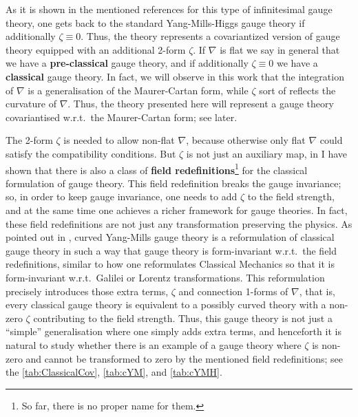 \documentclass[reqno,a4paper,oneside]{amsart}
\theoremstyle{plain}
\theoremstyle{remark}
\theoremstyle{definition}
\begin{document}
As it is shown in the mentioned references for this type of infinitesimal gauge theory, one gets back to the standard Yang-Mills-Higgs gauge theory if additionally $\zeta \equiv 0$. Thus, the theory represents a covariantized version of gauge theory equipped with an additional 2-form $\zeta$. If $\nabla$ is flat we say in general that we have a \textbf{pre-classical} gauge theory, and if additionally $\zeta \equiv 0$ we have a \textbf{classical} gauge theory. In fact, we will observe in this work that the integration of $\nabla$ is a generalisation of the Maurer-Cartan form, while $\zeta$ sort of reflects the curvature of $\nabla$. Thus, the theory presented here will represent a gauge theory covariantised w.r.t.\ the Maurer-Cartan form; see later.

The 2-form $\zeta$ is needed to allow non-flat $\nabla$, because otherwise only flat $\nabla$ could satisfy the compatibility conditions. But $\zeta$ is not just an auxiliary map, in \cite{MyThesis} I have shown that there is also a class of \textbf{field redefinitions}\footnote{So far, there is no proper name for them.} for the classical formulation of gauge theory. This field redefinition breaks the gauge invariance; so, in order to keep gauge invariance, one needs to add $\zeta$ to the field strength, and at the same time one achieves a richer framework for gauge theories. 
In fact, these field redefinitions are not just any transformation preserving the physics. As pointed out in \cite{MyThesis}, curved Yang-Mills gauge theory is a reformulation of classical gauge theory in such a way that gauge theory is form-invariant w.r.t.\ the field redefinitions, similar to how one reformulates Classical Mechanics so that it is form-invariant w.r.t.\ Galilei or Lorentz transformations. This reformulation precisely introduces those extra terms, $\zeta$ and connection 1-forms of $\nabla$, that is, every classical gauge theory is equivalent to a possibly curved theory with a non-zero $\zeta$ contributing to the field strength. Thus, this gauge theory is not just a ``simple'' generalisation where one simply adds extra terms, and henceforth it is natural to study whether there is an example of a gauge theory where $\zeta$ is non-zero and cannot be transformed to zero by the mentioned field redefinitions; see the \ref{tab:ClassicalCov}, \ref{tab:cYM}, and \ref{tab:cYMH}.
\end{document}
